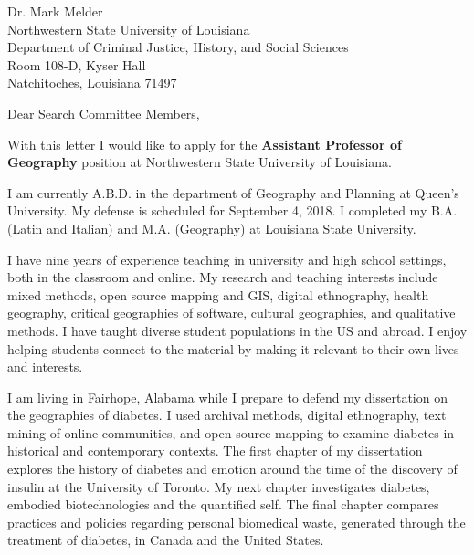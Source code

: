 \documentclass[10pt,a4paper]{letter}
\begin{document}
  \begin{letter}
  {Dr. Mark Melder \\ Northwestern State University of Louisiana \\ Department of Criminal Justice, History, and Social Sciences \\ Room 108-D, Kyser Hall \\ Natchitoches, Louisiana 71497}
  \opening{Dear Search Committee Members,} 
With this letter I would like to apply for the \textbf{Assistant Professor of Geography} position at Northwestern State University of Louisiana.

I am currently A.B.D. in the department of Geography and Planning at Queen's University. My defense is scheduled for September 4, 2018. I completed my B.A. (Latin and Italian) and M.A. (Geography) at Louisiana State University. 

I have nine years of experience teaching in university and high school settings, both in the classroom and online. My research and teaching interests include mixed methods, open source mapping and GIS, digital ethnography, health geography, critical geographies of software, cultural geographies, and qualitative methods. I have taught diverse student populations in the US and abroad. I enjoy helping students connect to the material by making it relevant to their own lives and interests.
  
I am living in Fairhope, Alabama while I prepare to defend my dissertation on the geographies of diabetes. I used archival methods, digital ethnography, text mining of online communities, and open source mapping to examine diabetes in historical and contemporary contexts. The first chapter of my dissertation explores the history of diabetes and emotion around the time of the discovery of insulin at the University of Toronto. My next chapter investigates diabetes, embodied biotechnologies and the quantified self. The final chapter compares practices and policies regarding personal biomedical waste, generated through the treatment of diabetes, in Canada and the United States.


\end{letter}
\end{document}
